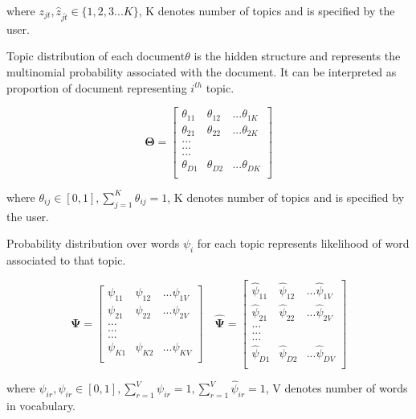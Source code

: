 \documentclass[a4paper]{article}
\begin{document}
where $z_{jt}, \hat{z}_{j\hat{t}} \in \{1,2,3 ... K \}$, K denotes number of topics and is specified by the user.

Topic distribution of each document$\theta$ is the hidden structure and represents the multinomial probability associated with the document. It can be interpreted as proportion of document representing $i^{th}$ topic.

\[
\mathbf{\Theta} = 
   	\begin{bmatrix}
    \theta_{11} & \theta_{12} & ... \theta_{1K}\\	\theta_{21} & \theta_{22} & ... \theta_{2K}\\ ...\\ ...\\ ...\\  \theta_{D1} & \theta_{D2} & ... \theta_{DK}\\ \end{bmatrix}
\]

where $\theta_{ij} \in [0,1], \sum_{j=1}^{K} \theta_{ij} = 1 $, K denotes number of topics and is specified by the user.

Probability distribution over words $\psi_{i}$ for each topic represents likelihood of word associated to that topic.

\[
\mathbf{\Psi} = 
   	\begin{bmatrix}
    \psi_{11} & \psi_{12} & ... \psi_{1V}\\	\psi_{21} & \psi_{22} & ... \psi_{2V}\\ ...\\ ...\\ ...\\  \psi_{K1} & \psi_{K2} & ... \psi_{KV}\\ \end{bmatrix} \quad
\mathbf{\hat{\Psi}} = 
   	\begin{bmatrix}
    \hat{\psi}_{11} & \hat{\psi}_{12} & ... \hat{\psi}_{1V}\\	\hat{\psi}_{21} & \hat{\psi}_{22} & ... \hat{\psi}_{2V}\\ ...\\ ...\\ ...\\  \hat{\psi}_{D1} & \hat{\psi}_{D2} & ... \hat{\psi}_{DV}\\ \end{bmatrix}
\]

where $\psi_{ir}, \hat{\psi}_{ir} \in [0,1], \sum_{r=1}^{V} \psi_{ir} = 1, \sum_{r=1}^{V} \hat{\psi}_{ir} = 1  $, V denotes number of words in vocabulary.
\end{document}
